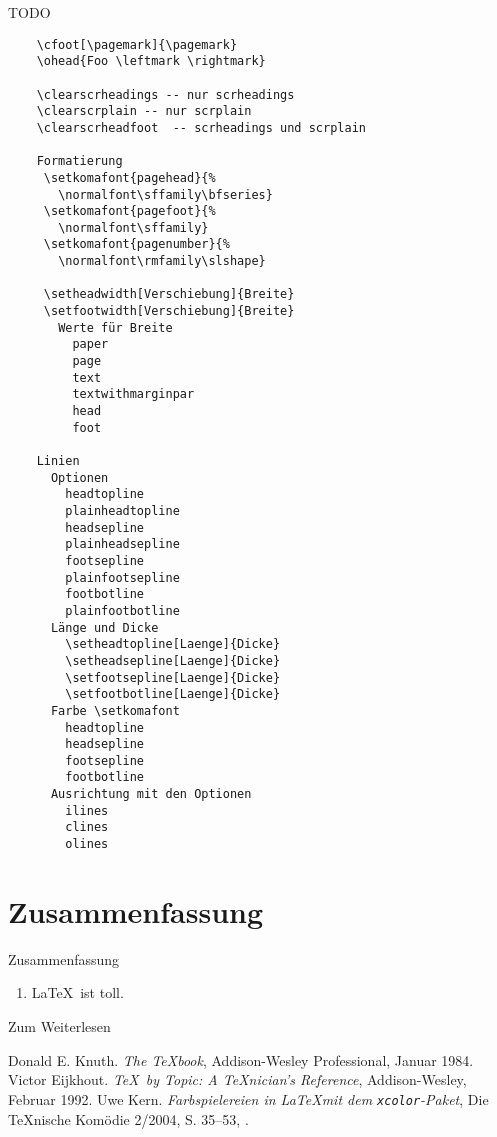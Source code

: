 \begin{Frame}{TODO}
  \begin{verbatim}
    \cfoot[\pagemark]{\pagemark}
    \ohead{Foo \leftmark \rightmark}
    
    \clearscrheadings -- nur scrheadings
    \clearscrplain -- nur scrplain
    \clearscrheadfoot  -- scrheadings und scrplain
    
    Formatierung
     \setkomafont{pagehead}{%
       \normalfont\sffamily\bfseries}
     \setkomafont{pagefoot}{%
       \normalfont\sffamily}
     \setkomafont{pagenumber}{%
       \normalfont\rmfamily\slshape}
    
     \setheadwidth[Verschiebung]{Breite}
     \setfootwidth[Verschiebung]{Breite}
       Werte für Breite
         paper
         page
         text
         textwithmarginpar
         head
         foot
    
    Linien
      Optionen
        headtopline
        plainheadtopline
        headsepline
        plainheadsepline
        footsepline
        plainfootsepline
        footbotline
        plainfootbotline
      Länge und Dicke
        \setheadtopline[Laenge]{Dicke}
        \setheadsepline[Laenge]{Dicke}
        \setfootsepline[Laenge]{Dicke}
        \setfootbotline[Laenge]{Dicke}
      Farbe \setkomafont
        headtopline
        headsepline
        footsepline
        footbotline
      Ausrichtung mit den Optionen
        ilines
        clines
        olines
  \end{verbatim}
\end{Frame}

\section*{Zusammenfassung}

\begin{frame}{Zusammenfassung}
  \begin{enumerate}
    \item \LaTeX\ ist toll.
  \end{enumerate}
\end{frame}

\begin{Frame}[fragile]{Zum Weiterlesen}
  \begin{thebibliography}{10}
      Donald E. Knuth.
      \newblock \emph{The \TeX book},
      \newblock Addison-Wesley Professional, Januar 1984.
      Victor Eijkhout.
      \newblock \emph{\TeX\ by Topic: A \TeX nician's Reference},
      \newblock Addison-Wesley, Februar 1992.
      Uwe Kern.
      \newblock \emph{Farbspielereien in \LaTeX mit dem \texttt{xcolor}-Paket},
      \newblock Die \TeX nische Komödie 2/2004, S. 35--53,
      \newblock {}.
  \end{thebibliography}
\end{Frame}